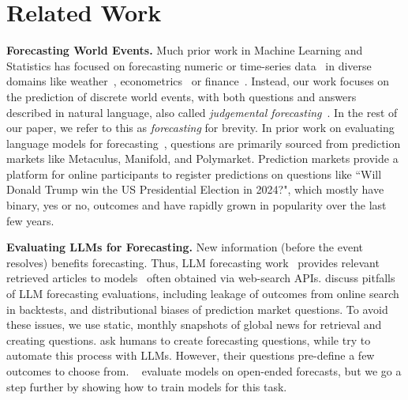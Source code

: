 \section{Related Work}
\label{sec:related}

 \textbf{Forecasting World Events.} Much prior work in Machine Learning and Statistics has focused on forecasting numeric or time-series data~\citep{BoxJenkins1976} in diverse domains like weather~\citep{Richardson1922}, econometrics~\citep{Tinbergen1939} or finance~\citep{Cowles1933}. Instead, our work focuses on the prediction of discrete world events, with both questions and answers described in natural language, also called \textit{judgemental forecasting}~\citep{tetlock2016superforecasting}. In the rest of our paper, we refer to this as \textit{forecasting} for brevity. In prior work on evaluating language models for forecasting~\citep{zou2022forecasting, karger2024forecastbench}, questions are primarily sourced from prediction markets like Metaculus, Manifold, and Polymarket. Prediction markets provide a platform for online participants to register predictions on questions like ``Will Donald Trump win the US Presidential Election in 2024?", which mostly have binary, yes or no, outcomes and have rapidly grown in popularity over the last few years.  \vspace{0.15cm}

 \textbf{Evaluating LLMs for Forecasting.} New information (before the event resolves) benefits forecasting. Thus, LLM forecasting work~\citep{zou2022forecasting, halawi2024approaching} provides relevant retrieved articles to models~\citep{lewis2020retrieval} often obtained via web-search APIs. \citet{paleka2025pitfalls} discuss pitfalls of LLM forecasting evaluations, including leakage of outcomes from online search in backtests, and distributional biases of prediction market questions. To avoid these issues, we use static, monthly snapshots of global news for retrieval and creating questions. \citet{jin-etal-2021-forecastqa} ask humans to create forecasting questions, while \citet{dai2024llms} try to automate this process with LLMs. However, their questions pre-define a few outcomes to choose from. ~\citet{guan2024openep, wang2025openforecast} evaluate models on open-ended forecasts, but we go a step further by showing how to train models for this task. \vspace{0.15cm} 

